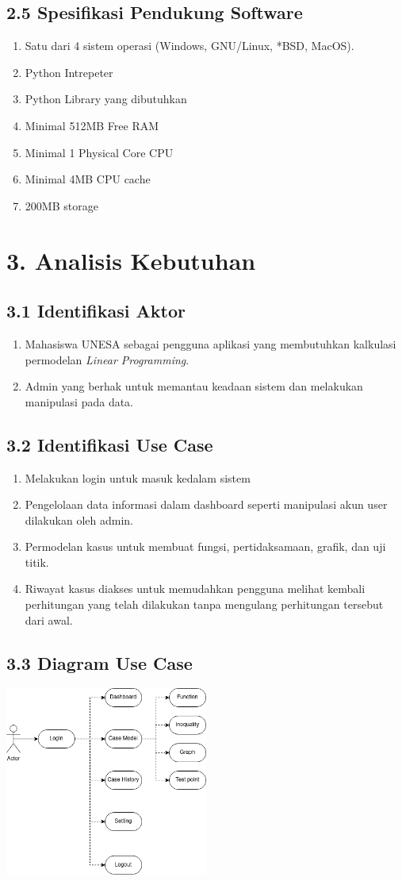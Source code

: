 \documentclass[a4paper]{article}
\begin{document}
    \subsection*{2.5 Spesifikasi Pendukung Software}
    \begin{enumerate}
        \item Satu dari 4 sistem operasi (Windows, GNU/Linux, *BSD, MacOS).
        \item Python Intrepeter
        \item Python Library yang dibutuhkan
        \item Minimal 512MB Free RAM 
        \item Minimal 1 Physical Core CPU
        \item Minimal 4MB CPU cache
        \item 200MB storage
    \end{enumerate}
\section*{3. Analisis Kebutuhan}
    \subsection*{3.1 Identifikasi Aktor}
    \begin{enumerate}
        \item Mahasiswa UNESA sebagai pengguna aplikasi yang
        membutuhkan kalkulasi permodelan \textit{Linear Programming}.
        \item Admin yang berhak untuk memantau keadaan sistem 
        dan melakukan manipulasi pada data.
    \end{enumerate}
    \subsection*{3.2 Identifikasi Use Case}
    \begin{enumerate}
        \item Melakukan login untuk masuk kedalam sistem
        \item Pengelolaan data informasi dalam dashboard
        seperti manipulasi akun user dilakukan oleh admin.
        \item Permodelan kasus untuk membuat fungsi, pertidaksamaan,
        grafik, dan uji titik.
        \item Riwayat kasus diakses untuk memudahkan pengguna melihat
        kembali perhitungan yang telah dilakukan tanpa mengulang
        perhitungan tersebut dari awal.
    \end{enumerate}
    \subsection*{3.3 Diagram Use Case}
    \includegraphics[width=0.5\textwidth]{uml-Use Case.drawio.png}
    \centering
\end{document}
